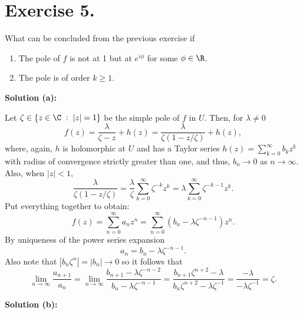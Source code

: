 
\section*{Exercise 5.}

What can be concluded from the previous exercise if
\begin{enumerate}[label = (\alph*)]
    \item The pole of $f$ is not at 1 but at $e^{i\phi}$ for some $\phi \in \R$.
    \item The pole is of order $k \geq 1$.
\end{enumerate}

\textbf{Solution (a):}

Let $\zeta \in \{z\in\C \;:\; |z| = 1\}$ be the simple pole of $f$ in $U$. Then, for $\lambda \neq 0$
\[ f(z) = \frac{\lambda}{\zeta-z} + h(z) = \frac{\lambda}{\zeta(1-z/\zeta)} + h(z), \]
where, again, $h$ is holomorphic at $U$ and has a Taylor series $h(z) = \sum_{k = 0}^{\infty} b_k z^k$ with radius of convergence strictly greater than one, and thus, $b_n \to 0$ as $n\to \infty$. Also, when $|z| < 1$,
\[ \frac{\lambda}{\zeta(1-z/\zeta)} = \frac{\lambda}{\zeta} \sum_{k = 0}^{\infty} \zeta^{-k} z^k = \lambda\sum_{k = 0}^{\infty} \zeta^{-k-1} z^k . \]
Put everything together to obtain:
\[ f(z) = \sum_{n = 0}^{\infty} a_n z^n = \sum_{n = 0}^{\infty} (b_n - \lambda \zeta^{-n-1}) z^n. \]
By uniqueness of the power series expansion
\[ a_n = b_n - \lambda \zeta^{-n-1}. \]
Also note that $|b_n \zeta^{n}| = |b_n| \to 0$ so it follows that
\[ \lim_{n\to\infty} \frac{a_{n+1}}{a_n} = \lim_{n\to\infty} \frac{b_{n+1} - \lambda \zeta^{-n-2}}{b_n - \lambda \zeta^{-n-1}} = \frac{b_{n+1} \zeta^{n+2} - \lambda}{b_n\zeta^{n+2} - \lambda \zeta^{-1} } = \frac{ - \lambda}{ - \lambda \zeta^{-1} } = \zeta.\]

\textbf{Solution (b):}

